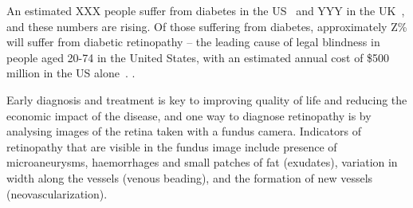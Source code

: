 An estimated XXX people suffer from diabetes in the US~\cite{source} and YYY in the UK~\cite{source}, and these numbers are rising. Of those suffering from diabetes, approximately Z\% will suffer from diabetic retinopathy -- the leading cause of legal blindness in people aged 20-74 in the United States, with an estimated annual cost of \$500 million in the US alone~\cite{Zhang_etal_JAMA10}.
\cite{Thomas_etal_BMJ12}.

Early diagnosis and treatment is key to improving quality of life and reducing the economic impact of the disease, and one way to diagnose retinopathy is by analysing images of the retina taken with a fundus camera. Indicators of retinopathy that are visible in the fundus image include presence of microaneurysms, haemorrhages and small patches of fat (exudates), variation in width along the vessels (venous beading), and the formation of new vessels (neovascularization). 